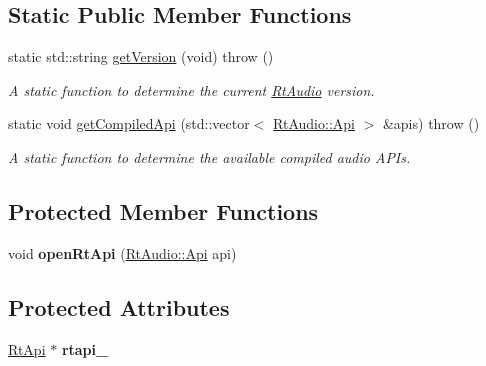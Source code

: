 \subsection*{Static Public Member Functions}
\begin{DoxyCompactItemize}
\item 
static std\+::string \hyperlink{class_rt_audio_a5b8f67e95949664ffc63ec88ac38cd54}{get\+Version} (void)  throw ()\hypertarget{class_rt_audio_a5b8f67e95949664ffc63ec88ac38cd54}{}\label{class_rt_audio_a5b8f67e95949664ffc63ec88ac38cd54}

\begin{DoxyCompactList}\small\item\em A static function to determine the current \hyperlink{class_rt_audio}{Rt\+Audio} version. \end{DoxyCompactList}\item 
static void \hyperlink{class_rt_audio_a1df0b60d45637f65dab961b658056503}{get\+Compiled\+Api} (std\+::vector$<$ \hyperlink{class_rt_audio_ac9b6f625da88249d08a8409a9db0d849}{Rt\+Audio\+::\+Api} $>$ \&apis)  throw ()
\begin{DoxyCompactList}\small\item\em A static function to determine the available compiled audio A\+P\+Is. \end{DoxyCompactList}\end{DoxyCompactItemize}
\subsection*{Protected Member Functions}
\begin{DoxyCompactItemize}
\item 
void {\bfseries open\+Rt\+Api} (\hyperlink{class_rt_audio_ac9b6f625da88249d08a8409a9db0d849}{Rt\+Audio\+::\+Api} api)\hypertarget{class_rt_audio_a087104938b7011d3e6fe2c09c55fb4b5}{}\label{class_rt_audio_a087104938b7011d3e6fe2c09c55fb4b5}

\end{DoxyCompactItemize}
\subsection*{Protected Attributes}
\begin{DoxyCompactItemize}
\item 
\hyperlink{class_rt_api}{Rt\+Api} $\ast$ {\bfseries rtapi\+\_\+}\hypertarget{class_rt_audio_ab2a64255e2563d501c1318dd9b60f471}{}\label{class_rt_audio_ab2a64255e2563d501c1318dd9b60f471}

\end{DoxyCompactItemize}


